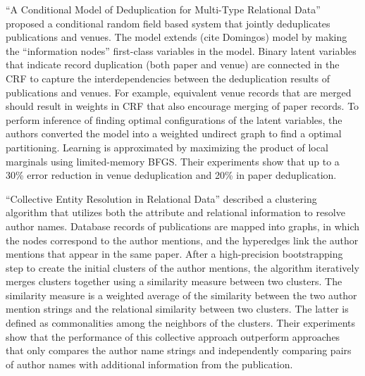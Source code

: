\documentclass[]{article}
\begin{document}
``A Conditional Model of Deduplication for Multi-Type Relational Data'' proposed a conditional random field based system that jointly deduplicates publications and venues.  The model extends (cite Domingos) model by making the ``information nodes'' first-class variables in the model.  Binary latent variables that indicate record duplication (both paper and venue) are connected in the CRF to capture the interdependencies between the deduplication results of publications and venues.  For example, equivalent venue records that are merged should result in weights in CRF that also encourage merging of paper records.  To perform inference of finding optimal configurations of the latent variables, the authors converted the model into a weighted undirect graph to find a optimal partitioning.  Learning is approximated by maximizing the product of local marginals using limited-memory BFGS.  Their experiments show that up to a 30\% error reduction in venue deduplication and 20\% in paper deduplication.

``Collective Entity Resolution in Relational Data'' described a clustering algorithm that utilizes both the attribute and relational information to resolve author names.  Database records of publications are mapped into graphs, in which the nodes correspond to the author mentions, and the hyperedges link the author mentions that appear in the same paper.  After a high-precision bootstrapping step to create the initial clusters of the author mentions, the algorithm iteratively merges clusters together using a similarity measure between two clusters.  The similarity measure is a weighted average of the similarity between the two author mention strings and the relational similarity between two clusters.  The latter is defined as commonalities among the neighbors of the clusters.  Their experiments show that the performance of this collective approach outperform approaches that only compares the author name strings and independently comparing pairs of author names with additional information from the publication.




\end{document}

